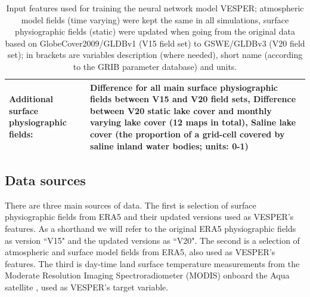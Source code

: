 \documentclass[hess, twostagejnl]{copernicus}
\begin{document}
\begin{table}
\begin{tabularx}{\textwidth}{lX}
		\\
		Additional surface physiographic fields:               & Difference for all main surface physiographic fields between V15 and V20 field sets, \newline 
		Difference between V20 static lake cover and monthly varying lake cover (12 maps in total),\newline 
		Saline lake cover (the proportion of a grid-cell covered by saline inland water bodies; units: 0-1)
		 \\
		\hline
	\end{tabularx}
\caption{Input features used for training the neural network model VESPER; atmospheric model fields (time varying) were kept the same in all simulations,  surface  physiographic  fields  (static)  were  updated  when  going  from  the  original  data  based  on GlobeCover2009/GLDBv1 (V15 field set) to GSWE/GLDBv3 (V20 field set); in brackets are variables description (where needed), short name (according to the GRIB parameter database) and units.
}
\label{table:definitions}
\end{table}

\subsection{Data sources }

There are three main sources of data. The first is selection of surface physiographic fields from ERA5 \citep{Hersbach} and their updated versions \citep{Choulga2019,Boussetta2021,Mu2021} used as VESPER’s features. As a shorthand we will refer to the original ERA5 physiographic fields as version ``V15" and the updated versions as ``V20". The second is a selection of atmospheric and surface model fields from ERA5, also used as VESPER’s features. The third is day-time land surface temperature measurements from the Moderate Resolution Imaging Spectroradiometer (MODIS) onboard the Aqua satellite \citep{MODIS}, used as VESPER’s target variable. 
\end{document}
